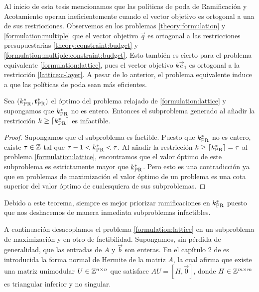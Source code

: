 Al inicio de esta tesis mencionamos que las políticas de poda de Ramificación y Acotamiento operan
ineficientemente cuando el vector objetivo es ortogonal a una de sus restricciones. Observemos
en los problemas \eqref{theory:formulation} y \eqref{formulation:multiple} que el vector objetivo
$\vec{q}$ es ortogonal a las restricciones presupuestarias \eqref{theory:constraint:budget} y
\eqref{formulation:multiple:constraint:budget}. Esto también es cierto para el problema
equivalente \eqref{formulation:lattice}, pues el vector objetivo $k\vec{e}_1$ es ortogonal a la
restricción \eqref{lattice:c-layer}. A pesar de lo anterior, el problema equivalente induce a que
las políticas de poda sean más eficientes.
\begin{theorem}
	\label{th:bbspeed}
	Sea $(k^*_{\text{PR}}, \boldsymbol{t}^*_{\text{PR}})$ el óptimo del problema relajado de \eqref{formulation:lattice}
	y supongamos que $k^*_{\text{PR}}$ no es entero. Entonces el subproblema generado al añadir la
	restricción $k \geq \left\lceil k^*_{\text{PR}} \right\rceil$ es infactible.
\end{theorem}
\begin{proof}
	Supongamos que el subproblema es factible. Puesto que $k^*_{\text{PR}}$ no es entero, existe $\tau \in
	\mathbb{Z}$ tal que $\tau - 1 < k^*_{\text{PR}} < \tau$. Al añadir la restricción $k \geq \left\lceil k^*_{\text{PR}} \right\rceil =
	\tau$ al problema \eqref{formulation:lattice}, encontramos que el valor óptimo de este
	subproblema es estrictamente mayor que $k^*_{\text{PR}}$. Pero esto es una contradicción ya que en
	problemas de maximización el valor óptimo de un problema es una cota superior del valor óptimo
	de cualesquiera de sus subproblemas.
\end{proof}
Debido a este teorema, siempre es mejor priorizar ramificaciones en $k^*_{\text{PR}}$ puesto que nos
deshacemos de manera inmediata subproblemas infactibles.

A continuación desacoplamos el problema \eqref{formulation:lattice} en un subproblema de
maximización y en otro de factibilidad. Supongamos, sin pérdida de generalidad, que las entradas de
$A$ y $\vec{b}$ son enteras. En el capítulo 2 de \cite{morris} es introducida la forma normal de
Hermite de la matriz $A$, la cual afirma que existe una matriz unimodular $U \in \mathbb{Z}^{n \times n}$
que satisface $AU = [H, \vec{0}]$, donde $H \in \mathbb{Z}^{m \times m}$ es triangular inferior y no
singular.


